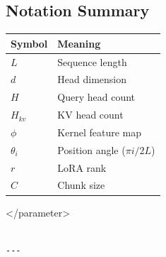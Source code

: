 \subsection{Notation Summary}

\begin{table}[H]
\centering
\small
\begin{tabular}{ll}
\toprule
\textbf{Symbol} & \textbf{Meaning} \\
\midrule
$L$ & Sequence length \\
$d$ & Head dimension \\
$H$ & Query head count \\
$H_{kv}$ & KV head count \\
$\phi$ & Kernel feature map \\
$\theta_i$ & Position angle ($\pi i / 2L$) \\
$r$ & LoRA rank \\
$C$ & Chunk size \\
\bottomrule
\end{tabular}
\end{table}
\textless{}/parameter\textgreater{}
\begin{lstlisting}

---
\end{lstlisting}